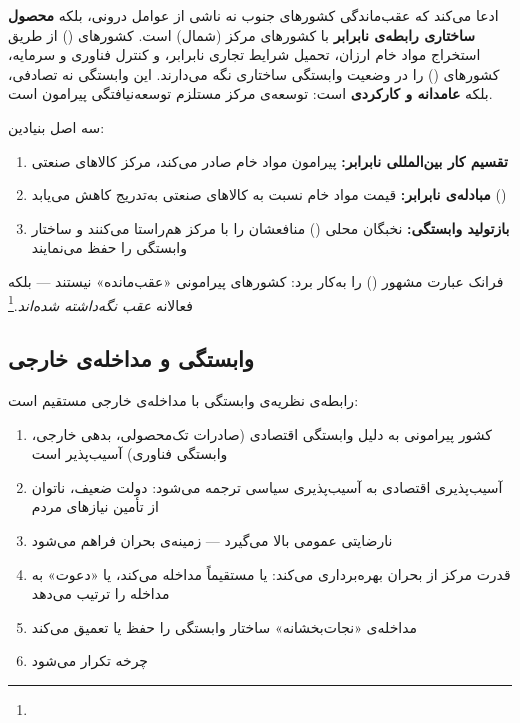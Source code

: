 \begin{tcolorbox}[defbox, title={تعریف: نظریه‌ی وابستگی}]
 ادعا می‌کند که عقب‌ماندگی کشورهای جنوب نه ناشی از عوامل درونی، بلکه \textbf{محصول ساختاری رابطه‌ی نابرابر} با کشورهای مرکز (شمال) است. کشورهای  () از طریق استخراج مواد خام ارزان، تحمیل شرایط تجاری نابرابر، و کنترل فناوری و سرمایه، کشورهای  () را در وضعیت وابستگی ساختاری نگه می‌دارند. این وابستگی نه تصادفی، بلکه \textbf{عامدانه و کارکردی} است: توسعه‌ی مرکز مستلزم توسعه‌نیافتگی پیرامون است.

سه اصل بنیادین:
\begin{enumerate}
\item \textbf{تقسیم کار بین‌المللی نابرابر:} پیرامون مواد خام صادر می‌کند، مرکز کالاهای صنعتی
\item \textbf{مبادله‌ی نابرابر:} قیمت مواد خام نسبت به کالاهای صنعتی به‌تدریج کاهش می‌یابد ()
\item \textbf{بازتولید وابستگی:} نخبگان محلی () منافعشان را با مرکز هم‌راستا می‌کنند و ساختار وابستگی را حفظ می‌نمایند
\end{enumerate}
\end{tcolorbox}

فرانک عبارت مشهور  () را به‌کار برد: کشورهای پیرامونی «عقب‌مانده» نیستند — بلکه فعالانه \textit{عقب نگه‌داشته شده‌اند}.\footnote{}

\subsection{وابستگی و مداخله‌ی خارجی}
\label{subsec:ch12-dependency-intervention}

رابطه‌ی نظریه‌ی وابستگی با مداخله‌ی خارجی مستقیم است:

\begin{tcolorbox}[wavebox, title={مکانیزم: وابستگی → آسیب‌پذیری → مداخله}]
\begin{enumerate}
\item کشور پیرامونی به دلیل وابستگی اقتصادی (صادرات تک‌محصولی، بدهی خارجی، وابستگی فناوری) آسیب‌پذیر است
\item آسیب‌پذیری اقتصادی به آسیب‌پذیری سیاسی ترجمه می‌شود: دولت ضعیف، ناتوان از تأمین نیازهای مردم
\item نارضایتی عمومی بالا می‌گیرد — زمینه‌ی بحران فراهم می‌شود
\item قدرت مرکز از بحران بهره‌برداری می‌کند: یا مستقیماً مداخله می‌کند، یا «دعوت» به مداخله را ترتیب می‌دهد
\item مداخله‌ی «نجات‌بخشانه» ساختار وابستگی را حفظ یا تعمیق می‌کند
\item چرخه تکرار می‌شود
\end{enumerate}
\end{tcolorbox}

